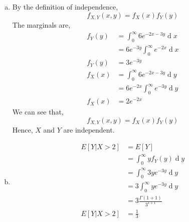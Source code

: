 \documentclass[answers]{exam}
\begin{document}
\begin{questions}
    \begin{framed}
        \begin{enumerate}[(a)]
            \item By the definition of independence,
                  \[f_{X,Y}(x,y)=f_X(x)f_Y(y)\]
                  The marginals are,
                  \begin{equation*}
                      \begin{split}
                          f_Y(y) & = \int_{0}^{\infty}6e^{-2x-3y}\operatorname{d}x\\
                          & = 6e^{-3y}\int_{0}^{\infty}e^{-2x}\operatorname{d}x\\
                          f_Y(y) & = 3e^{-3y}\\
                          f_X(x) & = \int_{0}^{\infty}6e^{-2x-3y}\operatorname{d}y\\
                          & = 6e^{-2x}\int_{0}^{\infty}e^{-3y}\operatorname{d}y\\
                          f_X(x) & = 2e^{-2x}
                      \end{split}
                  \end{equation*}
                  We can see that,
                  \[f_{X,Y}(x,y)=f_X(x)f_Y(y)\]
                  Hence, $X$ and $Y$ are independent.
            \item \begin{equation*}
                      \begin{split}
                          E[Y|X>2] & = E[Y]\\
                          & = \int_{0}^{\infty}yf_Y(y)\operatorname{d}y\\
                          & = \int_{0}^{\infty}3ye^{-3y}\operatorname{d}y\\
                          & = 3\int_{0}^{\infty}ye^{-3y}\operatorname{d}y\\
                          & = 3\frac{\Gamma(1+1)}{3^{1+1}}\\
                          E[Y|X>2] & = \frac{1}{3}\\
                      \end{split}
                  \end{equation*}
        \end{enumerate}
    \end{framed}

    \break
\end{questions}
\end{document}
